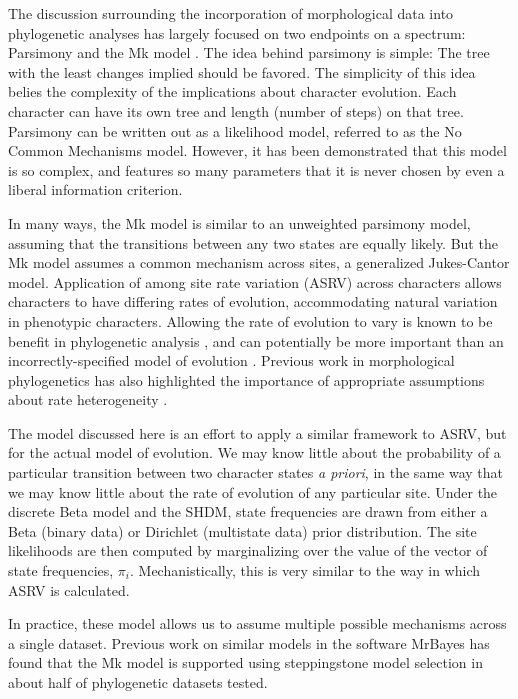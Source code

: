 \documentclass[]{article}
\begin{document}
The discussion surrounding the incorporation of morphological data into phylogenetic analyses has largely focused on two endpoints on a spectrum: Parsimony and the Mk model \citep{lewis2001likelihood}.
The idea behind parsimony is simple: The tree with the least changes implied should be favored.
The simplicity of this idea belies the complexity of the implications about character evolution.
Each character can have its own tree and length (number of steps) on that tree.
Parsimony can be written out as a likelihood model, referred to as the No Common Mechanisms model.
However, it has been demonstrated that this model is so complex, and features so many parameters	that it is never chosen by even a liberal information criterion. \par
In many ways, the Mk model is similar to an unweighted parsimony model, assuming that the transitions between any two states are equally likely.
But the Mk model assumes a common mechanism across sites, a generalized Jukes-Cantor model.
Application of among site rate variation (ASRV) across characters allows characters to have differing rates of evolution, accommodating natural variation in phenotypic characters. 
Allowing the rate of evolution to vary is known to be benefit in phylogenetic analysis \citep{felsenstein78}, and can potentially be more important than an incorrectly-specified model of evolution \citep{lemmon2004importance}.
Previous work in morphological phylogenetics has also highlighted the importance of appropriate assumptions about rate heterogeneity \citep{Harrison2014}.	\par
The model discussed here is an effort to apply a similar framework to ASRV, but for the actual model of evolution. 
We may know little about the probability of a particular transition between two character states \textit{a priori}, in the same way that we may know little about the rate of evolution of any particular site. 
Under the discrete Beta model and the SHDM, state frequencies are drawn from either a Beta (binary data) or Dirichlet (multistate data) prior distribution.
The site likelihoods are then computed by marginalizing over the value of the vector of state frequencies, $\pi_i$.
Mechanistically, this is very similar to the way in which ASRV is calculated. \par
In practice, these model allows us to assume multiple possible mechanisms across a single dataset. 
Previous work on similar models in the software MrBayes \citep{Wright2016} has found that the Mk model is supported using steppingstone model selection in about half of phylogenetic datasets tested.
\end{document}
